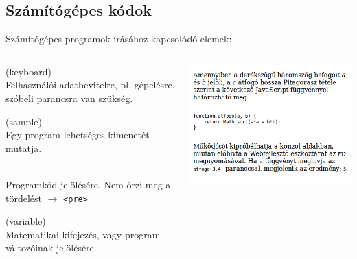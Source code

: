 \subsection{Számítógépes kódok}

\begin{frame}
  Számítógépes programok írásához kapcsolódó elemek:
  \begin{columns}[c]
      \begin{description}[m]
        \item[\texttt{<kbd>}] (keyboard) \hfill \\ Felhasználói adatbevitelre, pl. gépelésre, szóbeli parancsra van szükség.
        \item[\texttt{<samp>}] (sample) \hfill \\ Egy program lehetséges kimenetét mutatja.
        \item[\texttt{<code>}] \hfill \\ Programkód jelölésére. Nem őrzi meg a tördelést $\to$ \texttt{<pre>}
        \item[\texttt{<var>}] (variable) \hfill \\ Matematikai kifejezés, vagy program változóinak jelölésére.
      \end{description}
      \includegraphics[width=\textwidth]{kod.png}
  \end{columns} 
\end{frame}

\begin{frame}
  \begin{exampleblock}{}
    \scriptsize
    
  \end{exampleblock}
\end{frame}

